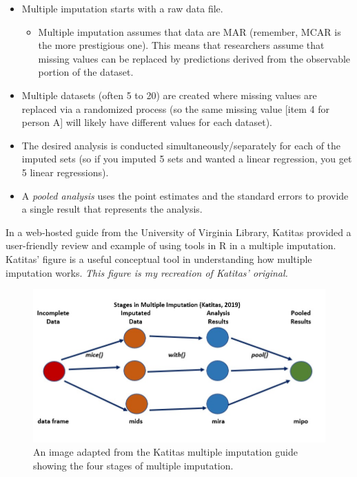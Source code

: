 \documentclass[
  11pt,
]{book}
\providecommand{\tightlist}{%
  \setlength{\itemsep}{0pt}\setlength{\parskip}{0pt}}
\begin{document}
\begin{itemize}
\tightlist
\item
  Multiple imputation starts with a raw data file.

  \begin{itemize}
  \tightlist
  \item
    Multiple imputation assumes that data are MAR (remember, MCAR is the more prestigious one). This means that researchers assume that missing values can be replaced by predictions derived from the observable portion of the dataset.\\
  \end{itemize}
\item
  Multiple datasets (often 5 to 20) are created where missing values are replaced via a randomized process (so the same missing value {[}item 4 for person A{]} will likely have different values for each dataset).
\item
  The desired analysis is conducted simultaneously/separately for each of the imputed sets (so if you imputed 5 sets and wanted a linear regression, you get 5 linear regressions).\\
\item
  A \emph{pooled analysis} uses the point estimates and the standard errors to provide a single result that represents the analysis.
\end{itemize}

In a web-hosted guide from the University of Virginia Library, Katitas \citeyearpar{katitas_getting_2019} provided a user-friendly review and example of using tools in R in a multiple imputation. Katitas' figure is a useful conceptual tool in understanding how multiple imputation works. \emph{This figure is my recreation of Katitas' original.}

\begin{figure}
\centering
\includegraphics{images/Ch05/KatitasMimpFig.jpg}
\caption{An image adapted from the Katitas multiple imputation guide showing the four stages of multiple imputation.}
\end{figure}
\end{document}
